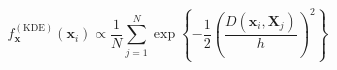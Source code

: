 \begin{equation}
    \label{eq:ad_kde}
    f_{\bm{x}}^{(\text{KDE})}(\bm{x}_i) \propto \frac{1}{N}\sum_{j = 1}^{N}\exp\left\lbrace-\frac{1}{2}\left(\frac{D(\bm{x}_i,\bm{X}_j)}{h}\right)^2\right\rbrace
\end{equation}
